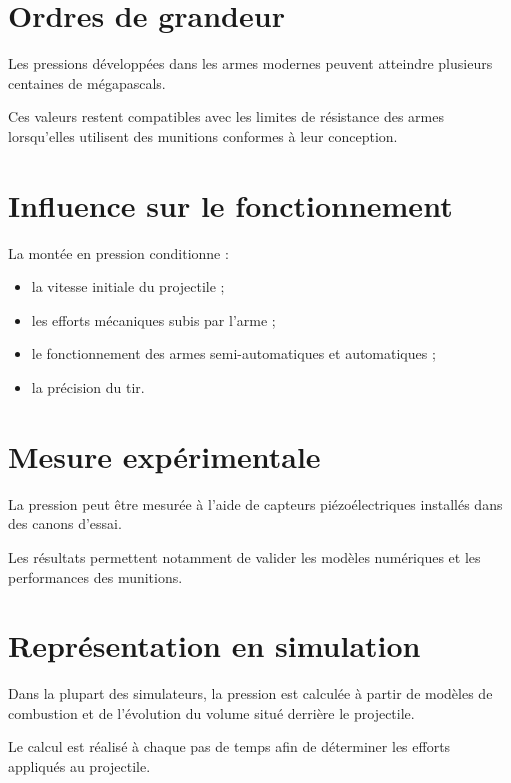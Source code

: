 \section{Ordres de grandeur}

Les pressions développées dans les armes modernes peuvent atteindre plusieurs
centaines de mégapascals.

Ces valeurs restent compatibles avec les limites de résistance des armes
lorsqu'elles utilisent des munitions conformes à leur conception.

\section{Influence sur le fonctionnement}

La montée en pression conditionne :

\begin{itemize}
    \item la vitesse initiale du projectile ;
    \item les efforts mécaniques subis par l'arme ;
    \item le fonctionnement des armes semi-automatiques et automatiques ;
    \item la précision du tir.
\end{itemize}

\section{Mesure expérimentale}

La pression peut être mesurée à l'aide de capteurs piézoélectriques installés
dans des canons d'essai.

Les résultats permettent notamment de valider les modèles numériques et les
performances des munitions.

\section{Représentation en simulation}

\begin{simulation}

Dans la plupart des simulateurs, la pression est calculée à partir de modèles
de combustion et de l'évolution du volume situé derrière le projectile.

Le calcul est réalisé à chaque pas de temps afin de déterminer les efforts
appliqués au projectile.

\end{simulation}

